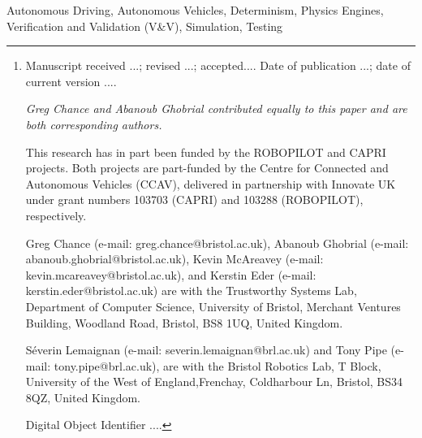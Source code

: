 \documentclass[letterpaper, 10 pt, journal, twoside]{IEEEtran}
\begin{document}
\author{Greg Chance, Abanoub Ghobrial, Kevin McAreavey, S\'everin Lemaignan, Tony Pipe, Kerstin Eder 
\thanks{{\footnotesize
Manuscript  
received ...;
revised ...;  
accepted.... 
Date of publication ...;
date of current version ....

\textit{Greg Chance and Abanoub Ghobrial contributed equally to this paper and are both corresponding authors.}
%

This research has in part been funded by the ROBOPILOT and CAPRI projects. Both projects are part-funded by the Centre for Connected and Autonomous Vehicles (CCAV), delivered in partnership with Innovate UK under grant numbers 103703 (CAPRI) and 103288 (ROBOPILOT), respectively.

Greg Chance (e-mail: greg.chance@bristol.ac.uk), 
Abanoub Ghobrial (e-mail: abanoub.ghobrial@bristol.ac.uk), 
Kevin McAreavey (e-mail: kevin.mcareavey@bristol.ac.uk), 
and 
Kerstin Eder (e-mail: kerstin.eder@bristol.ac.uk) 
are with the Trustworthy Systems Lab, Department of Computer Science, University of Bristol, Merchant Ventures Building, Woodland Road,  Bristol, BS8 1UQ, United Kingdom. 

S\'everin Lemaignan (e-mail: severin.lemaignan@brl.ac.uk)
and
Tony Pipe (e-mail: tony.pipe@brl.ac.uk), 
are with the Bristol Robotics Lab, T Block, University of the West of England,Frenchay, Coldharbour Ln, Bristol, BS34 8QZ, United Kingdom. 

Digital Object Identifier ....
}}}
%
%
\maketitle

\begin{abstract}
\noindent 

\end{abstract}

\begin{IEEEkeywords}
Autonomous Driving, Autonomous Vehicles, Determinism, Physics Engines,  Verification and Validation (V\&V), Simulation, Testing
\end{IEEEkeywords}
\IEEEpeerreviewmaketitle 
\end{document}
